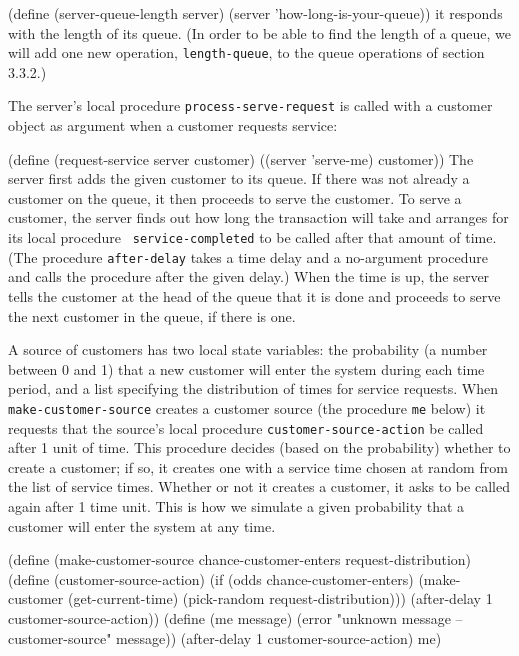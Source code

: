 \code
(define (server-queue-length server)
  (server 'how-long-is-your-queue))
\uncode\noindent
 it responds with the length of its queue.  (In order to be able to
find the length of a queue, we will add one new operation,
{\tt length-queue}, to the queue
operations of section 3.3.2.)

The server's local procedure {\tt process-serve-request} is called
with a customer object as argument when a customer requests service:

\code (define (request-service server customer)
  ((server 'serve-me) customer))
 \uncode\noindent
 The server first adds the given customer to its queue.  If there was
not already a customer on the queue, it then proceeds to serve the
customer.  To serve a customer, the server finds out how long the
transaction will take and arranges for its local procedure {\tt
service-completed} to be called after that amount of time.  (The
procedure {\tt after-delay} takes a time delay and a no-argument
procedure and calls the procedure after the given delay.)  When the
time is up, the server tells the customer at
the head of the queue that it is done and proceeds to serve the next
customer in the queue, if there is one.


A source of customers has two local state variables: the probability
(a number between 0 and 1) that a new customer will enter the system
during each time period, and a list specifying the distribution of
times for service requests.  When {\tt make-customer-source} creates a
customer source (the procedure {\tt me} below) it requests that the
source's local procedure {\tt customer-source-action} be called
after 1 unit of time.  This procedure decides (based on the probability)
whether to create a customer; if so, it creates one with a service
time chosen at random from the list of service times.   Whether or not it
creates a customer, it asks to be called again after 1 time unit.
This is how we simulate a given probability that a customer will enter
the system at any time.

\code
(define (make-customer-source chance-customer-enters
                              request-distribution)
  (define (customer-source-action)
    (if (odds chance-customer-enters)
        (make-customer (get-current-time)
                       (pick-random request-distribution)))
    (after-delay 1 customer-source-action))
  (define (me message)
     (error "unknown message -- customer-source" message))
  (after-delay 1 customer-source-action)
  me)
\uncode


